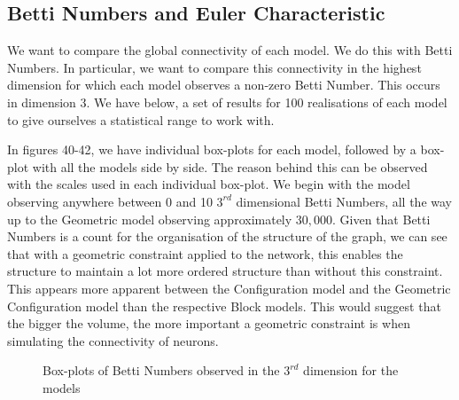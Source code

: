 \subsection{Betti Numbers and Euler Characteristic}
We want to compare the global connectivity of each model. We do this with Betti Numbers. In particular, we want to compare this connectivity in the highest dimension for which each model observes a non-zero Betti Number. This occurs in dimension 3. We have below, a set of results for 100 realisations of each model to give ourselves a statistical range to work with. 

In figures 40-42, we have individual box-plots for each model, followed by a box-plot with all the models side by side. The reason behind this can be observed with the scales used in each individual box-plot. We begin with the \ER model observing anywhere between 0 and 10 $3^{rd}$ dimensional Betti Numbers, all the way up to the Geometric model observing approximately $30,000$. Given that Betti Numbers is a count for the organisation of the structure of the graph, we can see that with a geometric constraint applied to the network, this enables the structure to maintain a lot more ordered structure than without this constraint. This appears more apparent between the Configuration model and the Geometric Configuration model than the respective Block models. This would suggest that the bigger the volume, the more important a geometric constraint is when simulating the connectivity of neurons.

\begin{figure}[H]%
    \centering
    \captionsetup{justification=centering}
    \qquad
    \caption{Box-plots of Betti Numbers observed in the $3^{rd}$ dimension for the models}%
    \label{fig:example}%
\end{figure}

